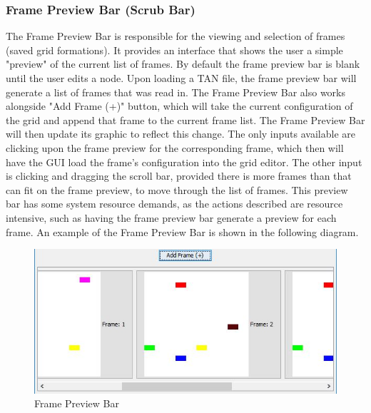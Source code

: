 \documentclass[12pt]{article}
\begin{document}
	\subsubsection {Frame Preview Bar (Scrub Bar)}
	The Frame Preview Bar is responsible for the viewing and selection of frames (saved grid formations). It provides an interface that shows the user a simple "preview" of the current list of frames. By default the frame preview bar is blank until the user edits a node. Upon loading a TAN file, the frame preview bar will generate a list of frames that was read in. The Frame Preview Bar also works alongside "Add Frame (+)" button, which will take the current configuration of the grid and append that frame to the current frame list. The Frame Preview Bar will then update its graphic to reflect this change. The only inputs available are clicking upon the frame preview for the corresponding frame, which then will have the GUI load the frame's configuration into the grid editor. The other input is clicking and dragging the scroll bar, provided there is more frames than that can fit on the frame preview, to move through the list of frames. This preview bar has some system resource demands, as the actions described are resource intensive, such as having the frame preview bar generate a preview for each frame. An example of the Frame Preview Bar is shown in the following diagram.
	
	\begin{figure}[ht!]
		\centering
		\includegraphics[width=150mm]{potoFramePre.JPG}
		\caption{Frame Preview Bar}
	\end{figure}

	
\end{document}
